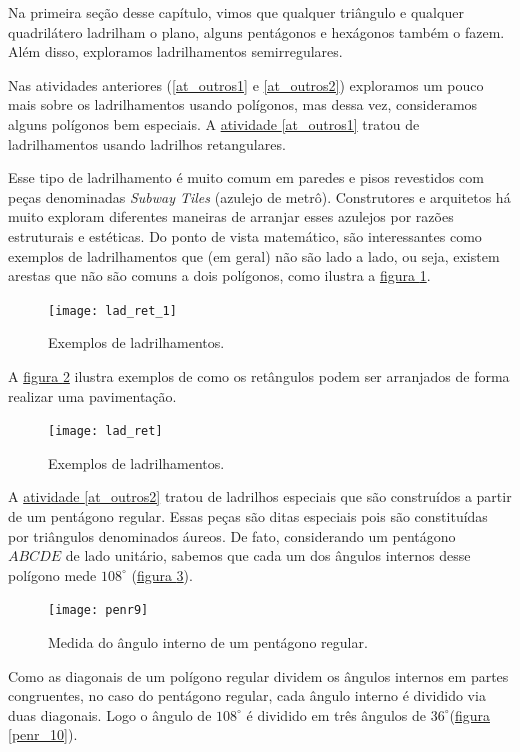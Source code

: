 \clearpage
{}


Na primeira seção desse capítulo, vimos que qualquer triângulo e qualquer quadrilátero ladrilham o plano, alguns pentágonos e hexágonos também o fazem. Além disso, exploramos ladrilhamentos semirregulares. 

Nas atividades anteriores (\ref{at_outros1} e \ref{at_outros2}) exploramos um pouco mais sobre os ladrilhamentos usando polígonos, mas dessa vez, consideramos alguns polígonos bem especiais. A \hyperref[at_outros1]{atividade \ref{at_outros1}} tratou de ladrilhamentos usando ladrilhos retangulares.

Esse tipo de ladrilhamento é muito comum em  paredes e pisos revestidos com peças denominadas \textit{Subway Tiles }(azulejo de metrô). Construtores e arquitetos  há muito exploram diferentes maneiras de arranjar esses azulejos por razões estruturais e estéticas. Do ponto de vista  matemático, são interessantes como exemplos de ladrilhamentos que (em geral) não são  lado a lado, ou seja, existem arestas que não são comuns a dois polígonos, como ilustra a \hyperref[lad_ret1]{figura \ref{lad_ret1}}.

\begin{figure}[H]
	\centering
	\texttt{[image: lad\_ret\_1]}
	\caption{Exemplos de ladrilhamentos.}
	\label{lad_ret1}
	\end{figure}


A \hyperref[lad_ret]{figura \ref{lad_ret}} ilustra exemplos de como os retângulos podem ser arranjados de forma realizar uma pavimentação.
 \begin{figure}[H]
	\centering
	\texttt{[image: lad\_ret]}
	\caption{Exemplos de ladrilhamentos.}
	\label{lad_ret}
	\end{figure}

A \hyperref[at_outros2]{atividade \ref{at_outros2}} tratou de ladrilhos especiais que são construídos a partir de um pentágono regular. Essas peças são ditas especiais pois são constituídas por triângulos denominados áureos. De fato, considerando  um pentágono $ABCDE$ de lado unitário, sabemos que cada um dos ângulos internos desse polígono mede $108^{\circ}$ (\hyperref[penr_9]{figura \ref{penr_9}}). 

\begin{figure}[H]
	\centering
	\texttt{[image: penr9]}
	\caption{Medida do ângulo interno de um pentágono regular.}
	\label{penr_9}
	\end{figure}


Como as diagonais de um polígono regular dividem os ângulos internos em partes congruentes, no caso do pentágono regular, cada ângulo interno é dividido via duas diagonais. Logo o ângulo de  $108^{\circ}$ é dividido em três ângulos de $36^{\circ}$(\hyperref[penr_10]{figura \ref{penr_10}}). 


